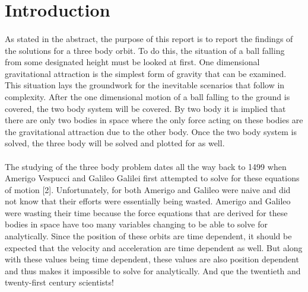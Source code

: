 \documentclass[]{article}
\begin{document}
\section{Introduction}
\begin{multicols}{2}
\paragraph{}
\setlength{\parskip}{1em}
As stated in the abstract, the purpose of this report is to report the findings of the solutions for a three body orbit. To do this, the situation of a ball falling from some designated height must be looked at first. One dimensional gravitational attraction is the simplest form of gravity that can be examined. This situation lays the groundwork for the inevitable scenarios that follow in complexity. After the one dimensional motion of a ball falling to the ground is covered, the two body system will be covered. By two body it is implied that there are only two bodies in space where the only force acting on these bodies are the gravitational attraction due to the other body. Once the two body system is solved, the three body will be solved and plotted for as well. 
\par
\paragraph{}
\setlength{\parskip}{1em}
The studying of the three body problem dates all the way back to 1499 when Amerigo Vespucci and Galileo Galilei first attempted to solve for these equations of motion [2]. Unfortunately, for both Amerigo and Galileo were naive and did not know that their efforts were essentially being wasted. Amerigo and Galileo were wasting their time because the force equations that are derived for these bodies in space have too many variables changing to be able to solve for analytically. Since the position of these orbits are time dependent, it should be expected that the velocity and acceleration are time dependent as well. But along with these values being time dependent, these values are also position dependent and thus makes it impossible to solve for analytically. And que the twentieth and twenty-first century scientists!
\par
\end{multicols}
\end{document}
